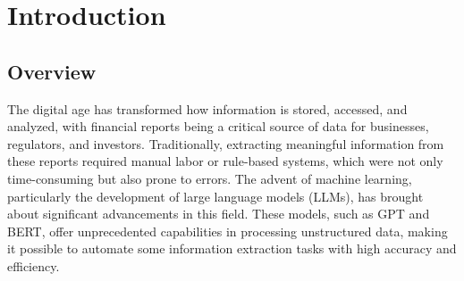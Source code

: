 \documentclass[english, 12pt, a4paper, elec, utf8, a-2b, online]{aaltothesis}
\begin{document}
\begin{acronym}
\end{acronym}



\thispagestyle{empty}

\newpage
\section{Introduction}
\label{sec:intro}

\subsection{Overview}

The digital age has transformed how information is stored, accessed, and analyzed, with financial reports being a critical source of data for businesses, regulators, and investors.
Traditionally, extracting meaningful information from these reports required manual labor or rule-based systems, which were not only time-consuming but also prone to errors.
The advent of machine learning, particularly the development of large language models (\acp{LLM}), has brought about significant advancements in this field.
These models, such as \ac{GPT} and \ac{BERT}, offer unprecedented capabilities in processing unstructured data, making it possible to automate some information extraction tasks with high accuracy and efficiency.
\end{document}
